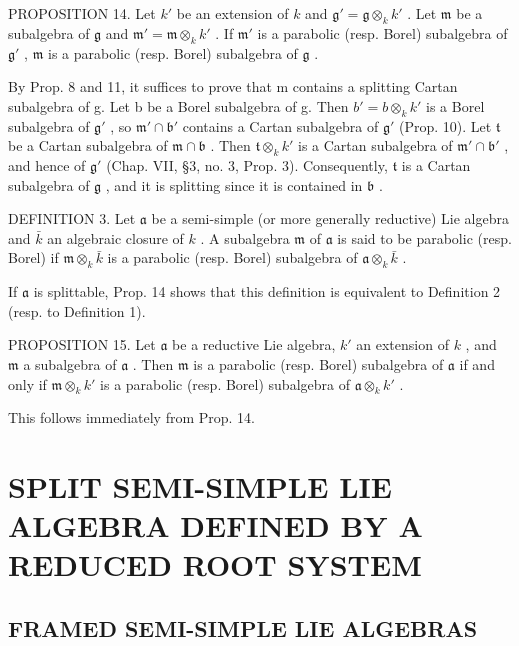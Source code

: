 PROPOSITION 14. Let \(k'\) be an extension of \(k\) and \(\mathfrak{g}' = \mathfrak{g} \otimes_k k'\) . Let \(\mathfrak{m}\) be a subalgebra of \(\mathfrak{g}\) and \(\mathfrak{m}' = \mathfrak{m} \otimes_k k'\) . If \(\mathfrak{m}'\) is a parabolic (resp. Borel) subalgebra of \(\mathfrak{g}'\) , \(\mathfrak{m}\) is a parabolic (resp. Borel) subalgebra of \(\mathfrak{g}\) .

By Prop. 8 and 11, it suffices to prove that m contains a splitting Cartan subalgebra of g. Let b be a Borel subalgebra of g. Then \(b' = b \otimes_{k} k'\) is a Borel subalgebra of \(\mathfrak{g}'\) , so \(\mathfrak{m}' \cap \mathfrak{b}'\) contains a Cartan subalgebra of \(\mathfrak{g}'\) (Prop. 10). Let \(\mathfrak{t}\) be a Cartan subalgebra of \(\mathfrak{m} \cap \mathfrak{b}\) . Then \(\mathfrak{t} \otimes_k k'\) is a Cartan subalgebra of \(\mathfrak{m}' \cap \mathfrak{b}'\) , and hence of \(\mathfrak{g}'\) (Chap. VII, §3, no. 3, Prop. 3). Consequently, \(\mathfrak{t}\) is a Cartan subalgebra of \(\mathfrak{g}\) , and it is splitting since it is contained in \(\mathfrak{b}\) .

DEFINITION 3. Let \(\mathfrak{a}\) be a semi-simple (or more generally reductive) Lie algebra and \(\bar{k}\) an algebraic closure of \(k\) . A subalgebra \(\mathfrak{m}\) of \(\mathfrak{a}\) is said to be parabolic (resp. Borel) if \(\mathfrak{m} \otimes_k \bar{k}\) is a parabolic (resp. Borel) subalgebra of \(\mathfrak{a} \otimes_k \bar{k}\) .

If \(\mathfrak{a}\) is splittable, Prop. 14 shows that this definition is equivalent to Definition 2 (resp. to Definition 1).

PROPOSITION 15. Let \(\mathfrak{a}\) be a reductive Lie algebra, \(k'\) an extension of \(k\) , and \(\mathfrak{m}\) a subalgebra of \(\mathfrak{a}\) . Then \(\mathfrak{m}\) is a parabolic (resp. Borel) subalgebra of \(\mathfrak{a}\) if and only if \(\mathfrak{m} \otimes_k k'\) is a parabolic (resp. Borel) subalgebra of \(\mathfrak{a} \otimes_k k'\) .

This follows immediately from Prop. 14.

\section{SPLIT SEMI-SIMPLE LIE ALGEBRA DEFINED BY A REDUCED ROOT SYSTEM}

\subsection{FRAMED SEMI-SIMPLE LIE ALGEBRAS}


